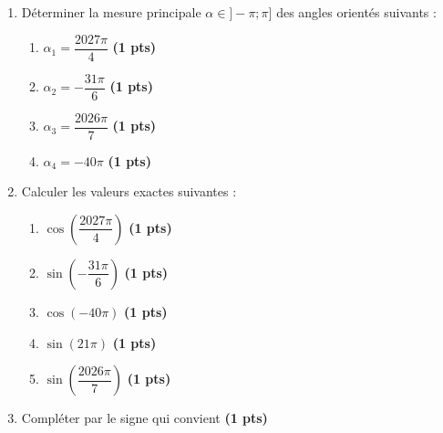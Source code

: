 \documentclass[12pt,a4paper]{article}
\begin{document}
\begin{enumerate}
\item Déterminer la mesure principale $\alpha \in ]-\pi ; \pi]$ des angles orientés suivants :

\begin{enumerate}
    \item $\alpha_1 = \dfrac{2027\pi}{4}$ \hfill \textbf{(1 pts)}
    \item $\alpha_2 = -\dfrac{31\pi}{6}$ \hfill \textbf{(1 pts)}
    \item $\alpha_3 = \dfrac{2026\pi}{7}$ \hfill \textbf{(1 pts)}
    \item $\alpha_4 = -40\pi$ \hfill \textbf{(1 pts)}
\end{enumerate}

\item Calculer les valeurs exactes suivantes : 
\begin{enumerate}
\item $\cos \left( \dfrac{2027\pi}{4} \right)$ \hfill \textbf{(1 pts)}
\item $\sin \left( -\dfrac{31\pi}{6} \right)$ \hfill \textbf{(1 pts)}
\item $\cos \left( -40\pi \right)$ \hfill \textbf{(1 pts)}
\item $\sin \left( 21\pi \right)$ \hfill \textbf{(1 pts)}
\item $\sin \left( \dfrac{2026\pi}{7} \right)$ \hfill \textbf{(1 pts)}
\end{enumerate}

\item Compléter par le signe qui convient \hfill \textbf{(1 pts)}


\end{enumerate}
\end{document}
